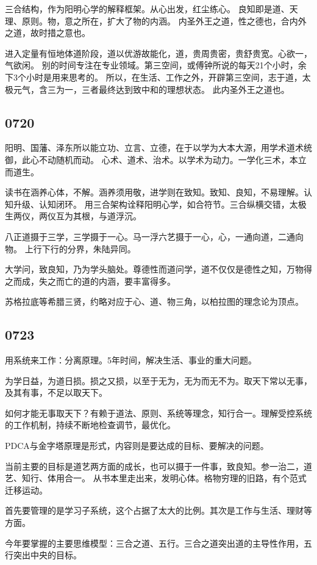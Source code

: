 三合结构，作为阳明心学的解释框架。从心出发，红尘练心。
良知即是道、天理、原则。物，意之所在，扩大了物的内涵。
内圣外王之道，性之德也，合内外之道，故时措之意也。

进入定量有恒地体道阶段，道以优游故能化，道，贵周贵密，贵舒贵宽。心欲一，气欲闲。
别的时间专注在专业领域。第三空间，或傅钟所说的每天21个小时，余下3个小时是用来思考的。
所以，在生活、工作之外，开辟第三空间，志于道，太极元气，含三为一，三者最终达到致中和的理想状态。
此内圣外王之道也。

\subsection{0720}

阳明、国藩、泽东所以能立功、立言、立德，在于以学为大本大源，用学术道术统御，此心不动随机而动。
心术、道术、治术。以学术为动力。一学化三术，本立而道生。

读书在涵养心体，不解。涵养须用敬，进学则在致知。致知、良知，不易理解。认知升级、认知闭环。
用三合架构诠释阳明心学，如合符节。三合纵横交错，太极生两仪，两仪互为其根，与道浮沉。

八正道摄于三学，三学摄于一心。马一浮六艺摄于一心，心，一通向道，二通向物。
上行下行的分界，朱陆异同。

大学问，致良知，乃为学头脑处。尊德性而道问学，道不仅仅是德性之知，万物得之而成，失之而亡的道的内涵，要丰富得多。

苏格拉底等希腊三贤，约略对应于心、道、物三角，以柏拉图的理念论为顶点。

\subsection{0723}

用系统来工作：分离原理。5年时间，解决生活、事业的重大问题。

为学日益，为道日损。损之又损，以至于无为，无为而无不为。取天下常以无事，及其有事，不足以取天下。

如何才能无事取天下？有赖于道法、原则、系统等理念，知行合一。理解受控系统的工作机制，持续不断地检查调节，最优化。

PDCA与金字塔原理是形式，内容则是要达成的目标、要解决的问题。

当前主要的目标是道艺两方面的成长，也可以摄于一件事，致良知。参一治二，道艺、知行、体用合一。
从书本里走出来，发明心体。格物穷理的旧路，有个范式迁移运动。

首先要管理的是学习子系统，这个占据了太大的比例。其次是工作与生活、理财等方面。

今年要掌握的主要思维模型：三合之道、五行。三合之道突出道的主导性作用，五行突出中央的目标。

